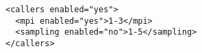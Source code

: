 \begin{verbatim}
<callers enabled="yes">
  <mpi enabled="yes">1-3</mpi>
  <sampling enabled="no">1-5</sampling>
</callers>
\end{verbatim}
